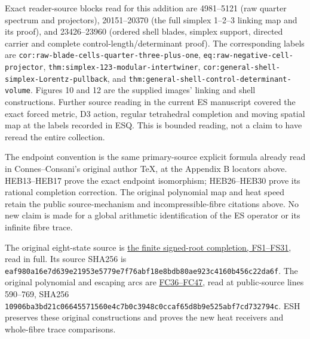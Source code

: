 \documentclass[
  10pt,
  a4paper,
]{article}
\begin{document}
Exact reader-source blocks read for this addition are 4981--5121 (raw
quarter spectrum and projectors), 20151--20370 (the full simplex 1--2--3
linking map and its proof), and 23426--23960 (ordered shell blades,
simplex support, directed carrier and complete
control-length/determinant proof). The corresponding labels are
\texttt{cor:\allowbreak{}raw-\allowbreak{}blade-\allowbreak{}cells-\allowbreak{}quarter-\allowbreak{}three-\allowbreak{}plus-\allowbreak{}one},
\texttt{eq:\allowbreak{}raw-\allowbreak{}negative-\allowbreak{}cell-\allowbreak{}projector},
\texttt{thm:\allowbreak{}simplex-\allowbreak{}123-\allowbreak{}modular-\allowbreak{}intertwiner},
\texttt{cor:\allowbreak{}general-\allowbreak{}shell-\allowbreak{}simplex-\allowbreak{}Lorentz-\allowbreak{}pullback}, and
\texttt{thm:\allowbreak{}general-\allowbreak{}shell-\allowbreak{}control-\allowbreak{}determinant-\allowbreak{}volume}. Figures 10 and 12
are the supplied images' linking and shell constructions. Further source
reading in the current ES manuscript covered the exact forced metric, D3
action, regular tetrahedral completion and moving spatial map at the
labels recorded in ESQ. This is bounded reading, not a claim to have
reread the entire collection.

The endpoint convention is the same primary-source explicit formula
already read in Connes--Consani's original author TeX, at the Appendix B
locators above. HEB13--HEB17 prove the exact endpoint isomorphism;
HEB26--HEB30 prove its rational completion correction. The original
polynomial map and heat speed retain the public source-mechanism and
incompressible-fibre citations above. No new claim is made for a global
arithmetic identification of the ES operator or its infinite fibre
trace.

The original eight-state source is
\href{https://github.com/KokunoYumeto/zeta-function-research-reader/blob/0fd693c844aad9117e30ec447c59864a28af10f3/workbenches/splitzero-tandem/continuations/20260921-native-spectral-real-pair/005/independent/FINITE_SIGNED_COMPLETION.tex}{the
finite signed-root completion, FS1--FS31}, read in full. Its source
SHA256 is
\texttt{eaf980a1\allowbreak{}6e7d639e\allowbreak{}21953e57\allowbreak{}79e7f76a\allowbreak{}bf18e8bd\allowbreak{}b80ae923\allowbreak{}c4160b45\allowbreak{}6c22da6f}.
The original polynomial and escaping arcs are
\href{https://github.com/KokunoYumeto/zeta-function-research-reader/blob/ab45e221579a0d48ce2885b4ecdf1a6aefc24a20/workbenches/splitzero-tandem/continuations/20260920-fable-boundary-action/FABLE_TO_ORIGINAL_CONDUCTOR.tex\#L590}{FC36--FC47},
read at public-source lines 590--769, SHA256
\texttt{10906ba3\allowbreak{}bd21c066\allowbreak{}45571560\allowbreak{}e4c7b0c3\allowbreak{}948c0cca\allowbreak{}f65d8b9e\allowbreak{}525abf7c\allowbreak{}d732794c}.
ESH preserves these original constructions and proves the new heat
receivers and whole-fibre trace comparisons.
\end{document}
